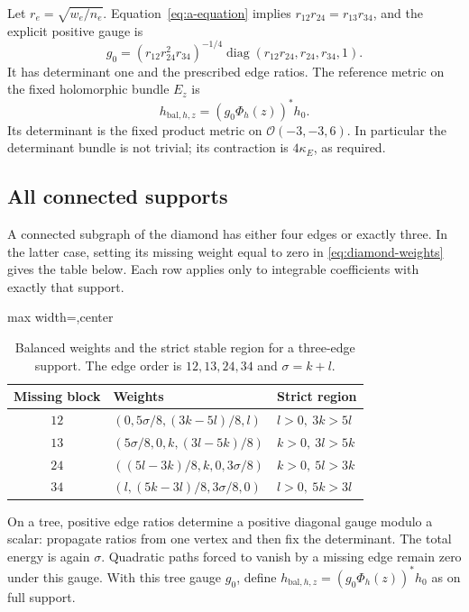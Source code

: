 \documentclass[11pt]{amsart}
\theoremstyle{definition}
\theoremstyle{remark}
\newcommand{\cO}{\mathcal O}
\newcommand{\diag}{\operatorname{diag}}
\begin{document}
Let $r_e=\sqrt{w_e/n_e}$. Equation~\eqref{eq:a-equation} implies
$r_{12}r_{24}=r_{13}r_{34}$, and the explicit positive gauge is
\begin{equation}\label{eq:diamond-gauge}
 g_0=(r_{12}r_{24}^2r_{34})^{-1/4}
       \diag(r_{12}r_{24},r_{24},r_{34},1).
\end{equation}
It has determinant one and the prescribed edge ratios. The reference
metric on the fixed holomorphic bundle $E_z$ is
\begin{equation}\label{eq:diamond-balanced}
 h_{\mathrm{bal},h,z}=(g_0\Phi_h(z))^*h_0.
\end{equation}
Its determinant is the fixed product metric on $\cO(-3,-3,6)$.
In particular the determinant bundle is not trivial; its contraction is
$4\kappa_E$, as required.

\subsection{All connected supports}
A connected subgraph of the diamond has either four edges or exactly
three. In the latter case, setting its missing weight equal to zero in
\eqref{eq:diamond-weights} gives the table below. Each row applies only
to integrable coefficients with exactly that support.

\begin{table}[htbp]
\centering
\caption{Balanced weights and the strict stable region for a three-edge
support. The edge order is $12,13,24,34$ and $\sigma=k+l$.}
\label{tab:tree-supports}
\begin{adjustbox}{max width=\textwidth,center}
\begin{tabular}{cll}
\toprule
Missing block & Weights & Strict region\\
\midrule
$12$ & $(0,5\sigma/8,(3k-5l)/8,l)$ & $l>0,\ 3k>5l$\\
$13$ & $(5\sigma/8,0,k,(3l-5k)/8)$ & $k>0,\ 3l>5k$\\
$24$ & $((5l-3k)/8,k,0,3\sigma/8)$ & $k>0,\ 5l>3k$\\
$34$ & $(l,(5k-3l)/8,3\sigma/8,0)$ & $l>0,\ 5k>3l$\\
\bottomrule
\end{tabular}
\end{adjustbox}
\end{table}

On a tree, positive edge ratios determine a positive diagonal gauge
modulo a scalar: propagate ratios from one vertex and then fix the
determinant. The total energy is again $\sigma$. Quadratic paths forced
to vanish by a missing edge remain zero under this gauge. With this tree
gauge $g_0$, define $h_{\mathrm{bal},h,z}=(g_0\Phi_h(z))^*h_0$
as on full support.
\end{document}
